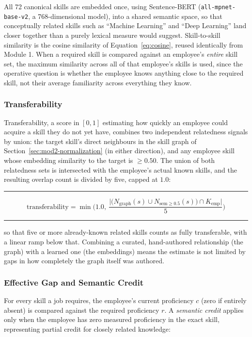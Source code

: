\documentclass[11pt,a4paper]{article}
\newcommand{\code}[1]{\texttt{\footnotesize #1}}
\newenvironment{formulabox}
  {\begin{center}\color{TPteal}\rule{0.92\linewidth}{0.8pt}\par\vspace{5pt}\color{TPnavy}}
  {\par\vspace{3pt}\color{TPteal}\rule{0.92\linewidth}{0.8pt}\end{center}}
\begin{document}
All 72 canonical skills are embedded once, using Sentence-BERT (\code{all-mpnet-base-v2}, a 768-dimensional model), into a shared semantic space, so that conceptually related skills such as ``Machine Learning'' and ``Deep Learning'' land closer together than a purely lexical measure would suggest. Skill-to-skill similarity is the cosine similarity of Equation~\ref{eq:cosine}, reused identically from Module 1. When a required skill is compared against an employee's \emph{entire} skill set, the maximum similarity across all of that employee's skills is used, since the operative question is whether the employee knows anything close to the required skill, not their average familiarity across everything they know.

\subsubsection{Transferability}

Transferability, a score in $[0,1]$ estimating how quickly an employee could acquire a skill they do not yet have, combines two independent relatedness signals by union: the target skill's direct neighbours in the skill graph of Section~\ref{sec:mod2-normalization} (in either direction), and any employee skill whose embedding similarity to the target is $\geq 0.50$. The union of both relatedness sets is intersected with the employee's actual known skills, and the resulting overlap count is divided by five, capped at $1.0$:

\begin{formulabox}
\begin{equation}
\label{eq:transferability}
\mathrm{transferability} = \min\!\Big(1.0,\ \frac{\big|\big(N_{\text{graph}}(s) \cup N_{\text{sem}\geq 0.5}(s)\big) \cap K_{\text{emp}}\big|}{5}\Big)
\end{equation}
\end{formulabox}

so that five or more already-known related skills counts as fully transferable, with a linear ramp below that. Combining a curated, hand-authored relationship (the graph) with a learned one (the embeddings) means the estimate is not limited by gaps in how completely the graph itself was authored.

\subsubsection{Effective Gap and Semantic Credit}

For every skill a job requires, the employee's current proficiency $c$ (zero if entirely absent) is compared against the required proficiency $r$. A \emph{semantic credit} applies only when the employee has zero measured proficiency in the exact skill, representing partial credit for closely related knowledge:
\end{document}
